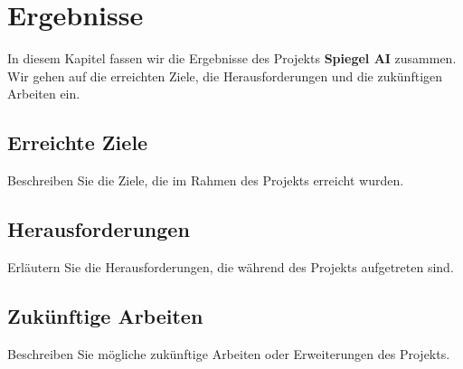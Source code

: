 \chapter{Ergebnisse}

In diesem Kapitel fassen wir die Ergebnisse des Projekts \textbf{Spiegel AI} zusammen. Wir gehen auf die erreichten Ziele, die Herausforderungen und die zukünftigen Arbeiten ein.

\section{Erreichte Ziele}
Beschreiben Sie die Ziele, die im Rahmen des Projekts erreicht wurden.

\section{Herausforderungen}
Erläutern Sie die Herausforderungen, die während des Projekts aufgetreten sind.

\section{Zukünftige Arbeiten}
Beschreiben Sie mögliche zukünftige Arbeiten oder Erweiterungen des Projekts.
